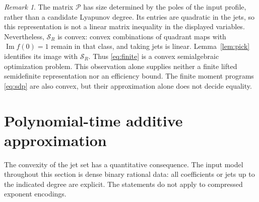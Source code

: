 \documentclass[11pt,a4paper]{article}
\theoremstyle{remark}\newtheorem{remark}[theorem]{Remark}
\newcommand{\Ima}{\operatorname{Im}}
\begin{document}
\begin{remark}
The matrix \(\mathcal P\) has size determined by the poles of the
input profile, rather than a candidate Lyapunov degree.
Its entries are quadratic in the jets, so this representation is not
a linear matrix inequality in the displayed variables. Nevertheless,
\(\mathcal S_R\) is convex: convex combinations of quadrant maps with
\(\Ima f(0)=1\) remain in that class, and taking jets is linear.
Lemma~\ref{lem:pick} identifies its image with \(\mathcal S_R\).
Thus \eqref{eq:finite} is a convex semialgebraic optimization problem.
This observation alone supplies neither a finite lifted semidefinite
representation nor an efficiency bound. The finite moment programs
\eqref{eq:sdp} are also convex, but their approximation alone does not
decide equality.
\end{remark}

\section{Polynomial-time additive approximation}
The convexity of the jet set has a quantitative consequence. The
input model throughout this section is dense binary rational data:
all coefficients or jets up to the indicated degree are explicit.
The statements do not apply to compressed exponent encodings.
\end{document}
